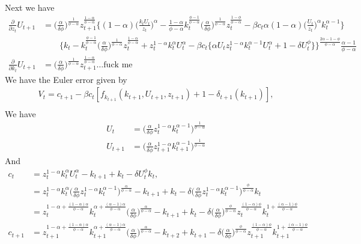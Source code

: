 \documentclass[a4paper]{article}
\theoremstyle{definition}
\begin{document}
Next we have
	\begin{align*}
	\frac{\partial}{\partial z_t}U_{t+1} 	&= \Big( \frac{\alpha}{\delta\phi} \Big)^{\frac{1}{\phi-\alpha}} z_{t+1}^{\frac{1-\alpha}{\phi-\alpha}}\bigg\{ (1-\alpha)\Big( \frac{k_t U_t}{z_t} \Big)^\alpha  - \frac{1-\alpha}{\phi-\alpha}k_t^{\frac{\phi-1}{\phi-\alpha}}\Big( \frac{\alpha}{\delta \phi} \Big)^{\frac{1}{\phi-\alpha}}z_t^{\frac{1-\phi}{\phi-\alpha}} - \beta c_t \alpha(1-\alpha)\Big( \frac{U_t}{z_t} \Big)^\alpha k_t^{\alpha-1} \bigg\} \\
	&\quad\quad  \bigg\{ k_t - k_t^{\frac{\phi-1}{\phi-\alpha}} \Big( \frac{\alpha}{\delta\phi} \Big)^{\frac{1}{\phi-\alpha}} z_t^{\frac{1-\alpha}{\phi-\alpha}} + z_{t}^{1-\alpha} k_{t}^{\alpha} U_{t}^{\alpha} - \beta c_t \bigg\{ \alpha U_{t} z_{t}^{1-\alpha} k_{t}^{\alpha-1} U_{t}^{\alpha}+1-\delta U_{t}^{\phi} \bigg\} \bigg\}^{\frac{2\alpha-1-\phi}{\phi-\alpha}}\frac{\alpha-1}{\phi-\alpha} \\
	\frac{\partial}{\partial k_t}U_{t+1}	&= \Big( \frac{\alpha}{\delta\phi} \Big)^{\frac{1}{\phi-\alpha}} z_{t+1}^{\frac{1-\alpha}{\phi-\alpha}} \dots \text{fuck me}
	\end{align*}
\newpage
We have the Euler error given by
	\begin{align*}
	V_t = c_{t+1} - \beta c_t [f_{k_{t+1}}(k_{t+1},U_{t+1},z_{t+1})+1-\delta_{t+1}(k_{t+1})], \\
	\end{align*}
We have
	\begin{align*}
	U_t 		&= \Big( \frac{\alpha}{\delta\phi}z_t^{1-\alpha}k_{t}^{\alpha-1} \Big)^{\frac{1}{\phi-\alpha}} \\
	U_{t+1}	&= \Big( \frac{\alpha}{\delta\phi}z_{t+1}^{1-\alpha}k_{t+1}^{\alpha-1} \Big)^{\frac{1}{\phi-\alpha}}
	\end{align*}
And
	\begin{align*}
	c_t 		&= z_{t}^{1-\alpha}k_{t}^{\alpha}U_{t}^{\alpha} - k_{t+1} + k_{t} - \delta U_{t}^{\phi} k_{t}, \\
				&= z_{t}^{1-\alpha}k_{t}^{\alpha}\Big( \frac{\alpha}{\delta\phi}z_t^{1-\alpha}k_{t}^{\alpha-1} \Big)^{\frac{\alpha}{\phi-\alpha}}-k_{t+1}+k_{t}-\delta \Big( \frac{\alpha}{\delta\phi}z_t^{1-\alpha}k_{t}^{\alpha-1} \Big)^{\frac{\phi}{\phi-\alpha}}k_{t} \\
				&= z_{t}^{1-\alpha+\frac{(1-\alpha)\alpha}{\phi-\alpha}} k_{t}^{\alpha+\frac{(\alpha-1)\alpha}{\phi-\alpha}} \Big( \frac{\alpha}{\delta\phi} \Big)^{\frac{\alpha}{\phi-\alpha}}-k_{t+1} + k_{t} - \delta \Big( \frac{\alpha}{\delta\phi} \Big)^{\frac{\phi}{\phi-\alpha}}z_{t}^{\frac{(1-\alpha)\phi}{\phi-\alpha}}k_{t}^{1+\frac{(\alpha-1)\phi}{\phi-\alpha}}  \\
	c_{t+1}	&= z_{t+1}^{1-\alpha+\frac{(1-\alpha)\alpha}{\phi-\alpha}} k_{t+1}^{\alpha+\frac{(\alpha-1)\alpha}{\phi-\alpha}} \Big( \frac{\alpha}{\delta\phi} \Big)^{\frac{\alpha}{\phi-\alpha}}-k_{t+2} + k_{t+1} - \delta \Big( \frac{\alpha}{\delta\phi} \Big)^{\frac{\phi}{\phi-\alpha}}z_{t+1}^{\frac{(1-\alpha)\phi}{\phi-\alpha}}k_{t+1}^{1+\frac{(\alpha-1)\phi}{\phi-\alpha}}		
	\end{align*}	
\end{document}
